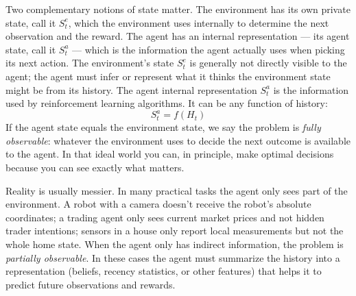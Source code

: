 Two complementary notions of state matter. The environment has its own private state, call it $S_t^e$, which the environment uses internally to determine the next observation and the reward. The agent has an internal representation — its agent state, call it $S_t^a$ — which is the information the agent actually uses when picking its next action. The environment’s state $S_t^e$ is generally not directly visible to the agent; the agent must infer or represent what it thinks the environment state might be from its history. The agent internal representation $S_t^a$ is the information used by reinforcement learning algorithms. It can be any function of history:
\begin{equation*}
    S_t^a = f(H_t)
\end{equation*}
If the agent state equals the environment state, we say the problem is \textit{fully observable}: whatever the environment uses to decide the next outcome is available to the agent. In that ideal world you can, in principle, make optimal decisions because you can see exactly what matters.

Reality is usually messier. In many practical tasks the agent only sees part of the environment. A robot with a camera doesn’t receive the robot’s absolute coordinates; a trading agent only sees current market prices and not hidden trader intentions; sensors in a house only report local measurements but not the whole home state. When the agent only has indirect information, the problem is \textit{partially observable}. In these cases the agent must summarize the history into a representation (beliefs, recency statistics, or other features) that helps it to predict future observations and rewards.

